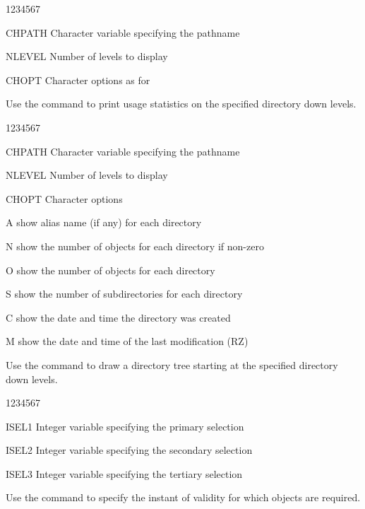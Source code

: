 
\begin{DLtt}{1234567}
\item[CHPATH]Character variable specifying the pathname
\item[NLEVEL]Number of levels to display
\item[CHOPT]Character options as for 
\end{DLtt}

Use the  command to print usage statistics on the
specified directory down  levels.


\begin{DLtt}{1234567}
\item[CHPATH]Character variable specifying the pathname
\item[NLEVEL]Number of levels to display
\item[CHOPT]Character options
  \begin{DLtt}{1}
    \item[A]show alias name (if any) for each directory
    \item[N]show the number of objects for each directory if non-zero
    \item[O]show the number of objects for each directory
    \item[S]show the number of subdirectories for each directory
    \item[C]show the date and time the directory was created
    \item[M]show the date and time of the last modification (RZ)
  \end{DLtt}
\end{DLtt}

Use the  command to draw a directory tree starting at the
specified directory down  levels.


\begin{DLtt}{1234567}
\item[ISEL1]Integer variable specifying the primary selection
\item[ISEL2]Integer variable specifying the secondary selection
\item[ISEL3]Integer variable specifying the tertiary selection
\end{DLtt}

Use the  command to specify the instant of validity for which
objects are required.

